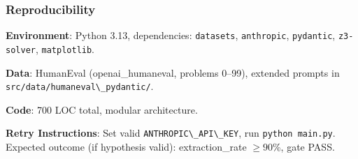 \subsubsection{Reproducibility}

\textbf{Environment}: Python 3.13, dependencies: \texttt{datasets}, \texttt{anthropic}, \texttt{pydantic}, \texttt{z3-solver}, \texttt{matplotlib}.

\textbf{Data}: HumanEval (openai\_humaneval, problems 0--99), extended prompts in \texttt{src/data/humaneval\textbackslash \_pydantic/}.

\textbf{Code}: 700 LOC total, modular architecture.

\textbf{Retry Instructions}: Set valid \texttt{ANTHROPIC\textbackslash \_API\textbackslash \_KEY}, run \texttt{python main.py}. Expected outcome (if hypothesis valid): extraction\_rate $\geq 90$\%, gate PASS.
